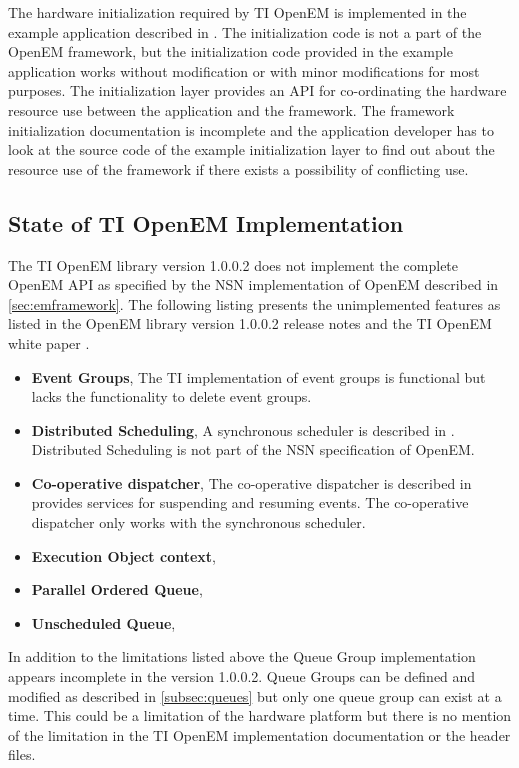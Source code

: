 The hardware initialization required by TI OpenEM is implemented in the example application described in \cite{openemuser}. The initialization code is not a part of the OpenEM framework, but the initialization code provided in the example application works without modification or with minor modifications for most purposes. The initialization layer provides an API for co-ordinating the hardware resource use between the application and the framework. \cite{openemuser} The framework initialization documentation is incomplete and the application developer has to look at the source code of the example initialization layer to find out about the resource use of the framework if there exists a possibility of conflicting use.

\subsection{State of TI OpenEM Implementation}
\label{subsec:ti-implementation-state}
The TI OpenEM library version 1.0.0.2 does not implement the complete OpenEM API as specified by the NSN implementation of OpenEM described in \ref{sec:emframework}. The following listing presents the unimplemented features as listed in the OpenEM library version 1.0.0.2 release notes \cite{openemnotes} and the TI OpenEM white paper \cite{moerman2014open}.

\begin{itemize}
    \item \textbf{Event Groups},
        The TI implementation of event groups is functional but lacks the functionality to delete event groups.
    \item \textbf{Distributed Scheduling},
        A synchronous scheduler is described in \cite{moerman2014open}. Distributed Scheduling is not part of the NSN specification of OpenEM.
    \item \textbf{Co-operative dispatcher},
        The co-operative dispatcher is described in \cite{moerman2014open} provides services for suspending and resuming events. The co-operative dispatcher only works with the synchronous scheduler.
    \item \textbf{Execution Object context},
    \item \textbf{Parallel Ordered Queue},
    \item \textbf{Unscheduled Queue},
\end{itemize}

In addition to the limitations listed above the Queue Group implementation appears incomplete in the version 1.0.0.2. Queue Groups can be defined and modified as described in \ref{subsec:queues} but only one queue group can exist at a time. This could be a limitation of the hardware platform but there is no mention of the limitation in the TI OpenEM implementation documentation or the header files.

